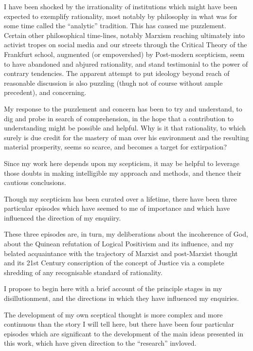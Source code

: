 \documentclass[10pt,titlepage]{book}
\begin{document}
I have been shocked by the irrationality of institutions which might have been expected to exemplify rationality, most notably by philosophy in what was for some time called the ``analytic'' tradition.
This has caused me puzzlement.
Certain other philosophical time-lines, notably Marxism reaching ultimately into activist tropes on social media and our streets through the Critical Theory of the Frankfurt school, augmented (or empovershed) by Post-modern scepticism, seem to have abandoned and abjured rationality, and stand testimonial to the power of contrary tendencies.
The apparent attempt to put ideology beyond reach of reasonable discussion is also puzzling (thugh not of course without ample precedent), and concerning.

My response to the puzzlement and concern has been to try and understand, to dig and probe in search of comprehension, in the hope that a contribution to understanding might be possible and helpful.
Why is it that rationality, to which surely is due credit for the mastery of man over his environment and the resulting material prosperity, seems so scarce, and becomes a target for extirpation?

Since my work here depends upon my scepticism, it may be helpful to leverage those doubts in making intelligible my approach and methods, and thence their cautious conclusions.

Though my scepticism has been curated over a lifetime, there have been three particular episodes which have seemed to me of importance and which have influenced the direction of my enquiiry.

These three episodes are, in turn, my deliberations about the incoherence of God, about the Quinean refutation of Logical Positivism and its influence, and my belated acquaintance with the trajectory of Marxist and post-Marxist thought and its 21st Century conscription of the concept of Justice via a complete shredding of any recognisable standard of rationality.

I propose to begin here with a brief account of the principle stages in my disillutionment, and the directions in which they have influenced my enquiries.

The development of my own sceptical thought is more complex and more continuous than the story I will tell here, but there have been four particular episodes which are significant to the development of the main ideas presented in this work, which have given direction to the ``research'' invloved.
\end{document}
